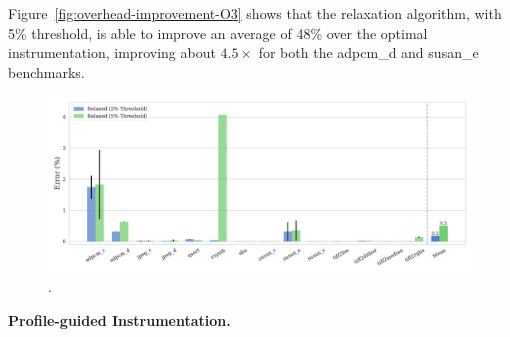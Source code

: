 Figure~\ref{fig:overhead-improvement-O3} shows that the relaxation algorithm, with 5\% threshold, is able to improve an average of 48\% over the optimal instrumentation, improving about $4.5\times$ for both the {\flagstype adpcm\_d} and {\flagstype susan\_e} benchmarks.

\begin{figure}[h!]
    \centering
    \includegraphics[width=\textwidth]{figs/error-O3.pdf}
    \caption{.}
    \label{fig:instr-all-thresholds}
\end{figure}

\textbf{Profile-guided Instrumentation.}

%




